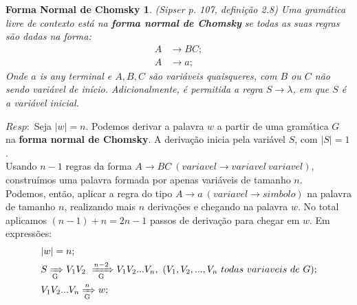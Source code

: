 \documentclass{homework}
\newtheorem*{theorem}{Forma Normal de Chomsky}
\begin{document}
	\begin{theorem}
		(Sipser p. 107, definição 2.8) Uma gramática livre de contexto está na \textbf{forma normal de Chomsky} se todas as suas regras são dadas na forma:
		\begin{align*}
			A & \rightarrow BC; \\
			A & \rightarrow a;
		\end{align*}
		Onde $a$ is any terminal e $A,B,C$ são variáveis quaisqueres, com $B$ ou $C$ não sendo variável de início. Adicionalmente, é permitida a regra $S \rightarrow \lambda$, em que $S$ é a variável inicial.  
	\end{theorem}
	$Resp:$ Seja $|w| = n$. Podemos derivar a palavra $w$ a partir de uma gramática $G$ na \textbf{forma normal de Chomsky}. A derivação inicia pela variável $S$, com $|S| = 1$.\\
	Usando $n-1$ regras da forma $A \rightarrow BC\ (variavel \rightarrow variavel\ variavel)$, construímos uma palavra formada por apenas variáveis de tamanho $n$.\\
	Podemos, então, aplicar a regra do tipo $A \rightarrow a\ (variavel \rightarrow simbolo)$ na palavra de tamanho $n$, realizando mais $n$ derivações e chegando na palavra $w$. No total aplicamos $(n - 1) + n = 2n -1$ passos de derivação para chegar em $w$. Em expressões:
		\begin{align*}
			& |w| = n; \\			
			& S \xRightarrow[\text{G}]{} V_1V_2\ \xRightarrow[\text{G}]{n-2} V_1V_2...V_n,\  (V_1,V_2,...,V_n\ todas\ variaveis\ de\ G); \\
			& V_1V_2...V_n \xRightarrow[\text{G}]{n} w;
		\end{align*}
\end{document}
